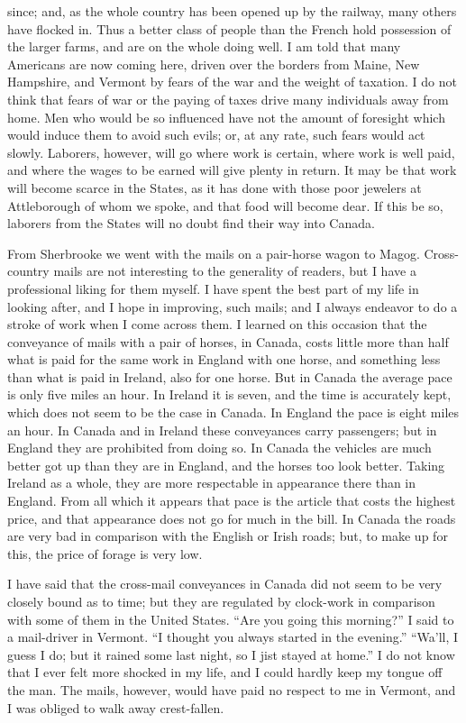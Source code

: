 since; and, as the whole country has been opened up by the railway,
many others have flocked in.  Thus a better class of people than
the French hold possession of the larger farms, and are on the
whole doing well.  I am told that many Americans are now coming
here, driven over the borders from Maine, New Hampshire, and
Vermont by fears of the war and the weight of taxation.  I do not
think that fears of war or the paying of taxes drive many
individuals away from home.  Men who would be so influenced have
not the amount of foresight which would induce them to avoid such
evils; or, at any rate, such fears would act slowly.  Laborers,
however, will go where work is certain, where work is well paid,
and where the wages to be earned will give plenty in return.  It
may be that work will become scarce in the States, as it has done
with those poor jewelers at Attleborough of whom we spoke, and that
food will become dear.  If this be so, laborers from the States
will no doubt find their way into Canada.

From Sherbrooke we went with the mails on a pair-horse wagon to
Magog.  Cross-country mails are not interesting to the generality
of readers, but I have a professional liking for them myself.  I
have spent the best part of my life in looking after, and I hope in
improving, such mails; and I always endeavor to do a stroke of work
when I come across them.  I learned on this occasion that the
conveyance of mails with a pair of horses, in Canada, costs little
more than half what is paid for the same work in England with one
horse, and something less than what is paid in Ireland, also for
one horse.  But in Canada the average pace is only five miles an
hour.  In Ireland it is seven, and the time is accurately kept,
which does not seem to be the case in Canada.  In England the pace
is eight miles an hour.  In Canada and in Ireland these conveyances
carry passengers; but in England they are prohibited from doing so.
In Canada the vehicles are much better got up than they are in
England, and the horses too look better.  Taking Ireland as a
whole, they are more respectable in appearance there than in
England.  From all which it appears that pace is the article that
costs the highest price, and that appearance does not go for much
in the bill.  In Canada the roads are very bad in comparison with
the English or Irish roads; but, to make up for this, the price of
forage is very low.

I have said that the cross-mail conveyances in Canada did not seem
to be very closely bound as to time; but they are regulated by
clock-work in comparison with some of them in the United States.
``Are you going this morning?'' I said to a mail-driver in Vermont.
``I thought you always started in the evening.''  ``Wa'll, I guess I
do; but it rained some last night, so I jist stayed at home.''  I do
not know that I ever felt more shocked in my life, and I could
hardly keep my tongue off the man.  The mails, however, would have
paid no respect to me in Vermont, and I was obliged to walk away
crest-fallen.

